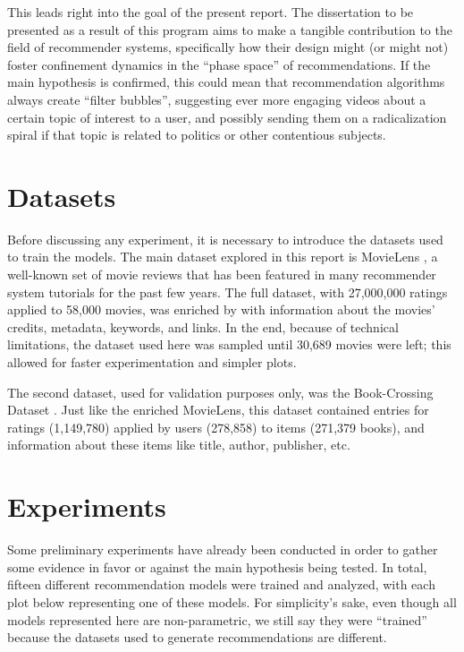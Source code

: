 This leads right into the goal of the present report. The dissertation to be
presented as a result of this program aims to make a tangible contribution to
the field of recommender systems, specifically how their design might (or might
not) foster confinement dynamics in the ``phase space'' of recommendations. If
the main hypothesis is confirmed, this could mean that recommendation algorithms
always create ``filter bubbles'', suggesting ever more engaging videos about a
certain topic of interest to a user, and possibly sending them on a
radicalization spiral if that topic is related to politics or other contentious
subjects.

\section{Datasets}
\label{sec:datasets}

Before discussing any experiment, it is necessary to introduce the datasets used
to train the models. The main dataset explored in this report is MovieLens
\citep{harper_movielens_2015}, a well-known set of movie reviews that has been
featured in many recommender system tutorials for the past few years. The full
dataset, with 27,000,000 ratings applied to 58,000 movies, was enriched by
\citet{banik_movies_2017} with information about the movies' credits, metadata,
keywords, and links. In the end, because of technical limitations, the dataset
used here was sampled until 30,689 movies were left; this allowed for faster
experimentation and simpler plots.

The second dataset, used for validation purposes only, was the Book-Crossing
Dataset \citep{ziegler_book-crossing_2004}. Just like the enriched MovieLens,
this dataset contained entries for ratings (1,149,780) applied by users
(278,858) to items (271,379 books), and information about these items like
title, author, publisher, etc.

\section{Experiments}
\label{sec:experiments}

Some preliminary experiments have already been conducted in order to gather some
evidence in favor or against the main hypothesis being tested. In total, fifteen
different recommendation models were trained and analyzed, with each plot below
representing one of these models. For simplicity's sake, even though all models
represented here are non-parametric, we still say they were ``trained'' because
the datasets used to generate recommendations are different.

